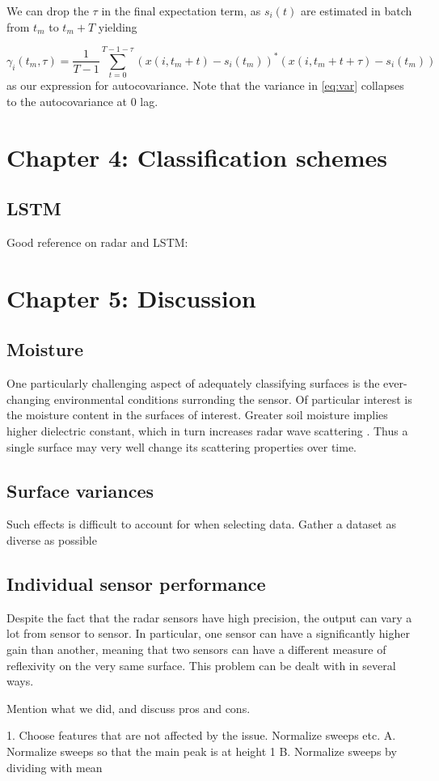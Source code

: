 \documentclass[a4paper, 12pt]{article}
\begin{document}
We can drop the $\tau$ in the final expectation term, as $s_i(t)$ are estimated in batch from $t_m$ to  $t_m + T$ yielding

\begin{equation}
	\gamma_i(t_m, \tau) = \frac{1}{T-1}\sum_{t=0}^{T-1- \tau}(x(i, t_m + t) - s_i(t_m))^*(x(i, t_m + t + \tau) - s_i(t_m))
\end{equation}
as our expression for autocovariance. Note that the variance in \ref{eq:var} collapses to the autocovariance at 0 lag. 


\section{Chapter 4: Classification schemes}

\subsection{LSTM}

Good reference on radar and LSTM: \citep{jithesh_sagayaraj_srinivasa_2018}

\section{Chapter 5: Discussion}


\subsection{Moisture}

One particularly challenging aspect of adequately classifying surfaces is the ever-changing environmental conditions surronding the sensor. Of particular interest is the moisture content in the surfaces of interest. Greater soil moisture implies higher dielectric constant, which in turn increases radar wave scattering \citep{rappaport_2006}. Thus a single surface may very well change its scattering properties over time. 


\subsection{Surface variances}

Such effects is difficult to account for when selecting data. Gather a dataset as diverse as possible

\subsection{Individual sensor performance}
Despite the fact that the radar sensors have high precision, the output can vary a lot from sensor to sensor. In particular, one sensor can have a significantly higher gain than another, meaning that two sensors can have a different measure of reflexivity on the very same surface. This problem can be dealt with in several ways. 

Mention what we did, and discuss pros and cons.

1. Choose features that are not affected by the issue. Normalize sweeps etc.
	A. Normalize sweeps so that the main peak is at height 1
	B. Normalize sweeps by dividing with mean 

\newpage


\end{document}

